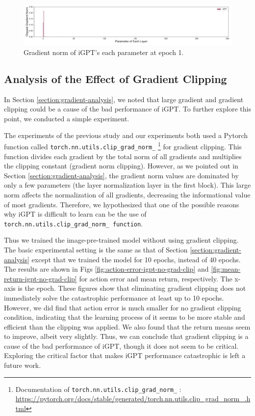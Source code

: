 \documentclass{article}
\begin{document}
\begin{figure}[H]
    \centering
        \includegraphics[width=\linewidth]{figs/gradnorm_perparam_1_igpt_hopper_medium_666.pdf}
    \caption{Gradient norm of iGPT's each parameter at epoch 1.}
    \label{fig:param-norm-per-param}
\end{figure}

\subsection{Analysis of the Effect of Gradient Clipping}
\label{appendix:gradient-clipping}
In Section \ref{section:gradient-analysis}, we noted that large gradient and gradient clipping could be a cause of the bad performance of iGPT. To further explore this point, we conducted a simple experiment.

The experiments of the previous study \cite{reid2022can} and our experiments both used a Pytorch function called \lstinline{torch.nn.utils.clip_grad_norm_}
\footnote{
Documentation of \lstinline{torch.nn.utils.clip_grad_norm_} : \\
\href{https://pytorch.org/docs/stable/generated/torch.nn.utils.clip_grad_norm_.html}{https://pytorch.org/docs/stable/generated/torch.nn.utils.clip\_grad\_norm\_.html}
}
for gradient clipping. This function divides each gradient by the total norm of all gradients and multiplies the clipping constant (gradient norm clipping). However, as we pointed out in Section \ref{section:gradient-analysis}, the gradient norm values are dominated by only a few parameters (the layer normalization layer in the first block). This large norm affects the normalization of all gradients, decreasing the informational value of most gradients. Therefore, we hypothesized that one of the possible reasons why iGPT is difficult to learn can be the use of \lstinline{torch.nn.utils.clip_grad_norm_ function}. 

Thus we trained the image-pre-trained model without using gradient clipping. The basic experimental setting is the same as that of Section \ref{section:gradient-analysis} except that we trained the model for 10 epochs, instead of 40 epochs. The results are shown in Figs \ref{fig:action-error-igpt-no-grad-clip} and \ref{fig:mean-return-igpt-no-grad-clip} for action error and mean return, respectively. The x-axis is the epoch. These figures show that eliminating gradient clipping does not immediately solve the catastrophic performance at least up to 10 epochs. However, we did find that action error is much smaller for no gradient clipping condition, indicating that the learning process of it seems to be more stable and efficient than the clipping was applied. We also found that the return means seem to improve, albeit very slightly. Thus, we can conclude that gradient clipping is a cause of the bad performance of iGPT, though it does not seem to be critical. Exploring the critical factor that makes iGPT performance catastrophic is left a future work.
\end{document}
